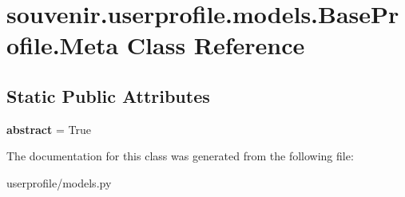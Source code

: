 \hypertarget{classsouvenir_1_1userprofile_1_1models_1_1BaseProfile_1_1Meta}{\section{souvenir.\-userprofile.\-models.\-Base\-Profile.\-Meta Class Reference}
\label{classsouvenir_1_1userprofile_1_1models_1_1BaseProfile_1_1Meta}
}
\subsection*{Static Public Attributes}
\begin{DoxyCompactItemize}
\item 
\hypertarget{classsouvenir_1_1userprofile_1_1models_1_1BaseProfile_1_1Meta_a0219aeb492e19262296eccf1f995c805}{{\bfseries abstract} = True}\label{classsouvenir_1_1userprofile_1_1models_1_1BaseProfile_1_1Meta_a0219aeb492e19262296eccf1f995c805}

\end{DoxyCompactItemize}


The documentation for this class was generated from the following file\-:\begin{DoxyCompactItemize}
\item 
userprofile/models.\-py\end{DoxyCompactItemize}
